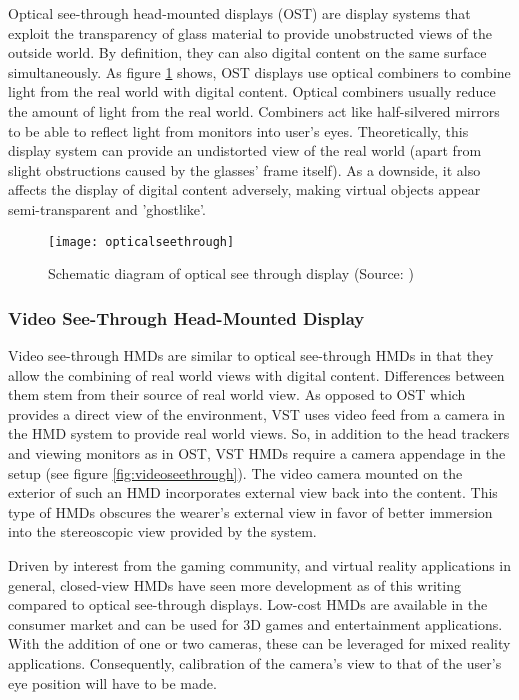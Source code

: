 Optical see-through head-mounted displays (OST) are display systems that exploit the transparency of glass material to provide unobstructed views of the outside world. By definition, they can also digital content on the same surface simultaneously. As figure \ref{fig:opticalseethrough} shows, OST displays use optical combiners to combine light from the real world with digital content. Optical combiners usually reduce the amount of light from the real world. Combiners act like half-silvered mirrors to be able to reflect light from monitors into user's eyes. Theoretically, this display system can provide an undistorted view of the real world (apart from slight obstructions caused by the glasses' frame itself). As a downside, it also affects the display of digital content adversely, making virtual objects appear semi-transparent and 'ghostlike'.

\begin{figure}
	\centering
	\texttt{[image: opticalseethrough]}
	\caption{Schematic diagram of optical see through display (Source: \cite{azuma1997survey})}
	\label{fig:opticalseethrough}
\end{figure}

\subsubsection{Video See-Through Head-Mounted Display}
Video see-through HMDs are similar to optical see-through HMDs in that they allow the combining of real world views with digital content. Differences between them stem from their source of real world view. As opposed to OST which provides a direct view of the environment, VST uses video feed from a camera in the HMD system to provide real world views. So, in addition to the head trackers and viewing monitors as in OST, VST HMDs require a camera appendage in the setup (see figure \ref{fig:videoseethrough}). The video camera mounted on the exterior of such an HMD incorporates external view back into the content. This type of HMDs obscures the wearer's external view in favor of better immersion into the stereoscopic view provided by the system. 

Driven by interest from the gaming community, and virtual reality applications in general, closed-view HMDs have seen more development as of this writing compared to optical see-through displays. Low-cost HMDs are available in the consumer market and can be used for 3D games and entertainment applications. With the addition of one or two cameras, these can be leveraged for mixed reality applications. Consequently, calibration of the camera's view to that of the user's eye position will have to be made.

